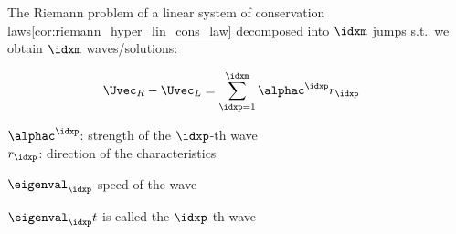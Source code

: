 \begin{corbox}\nospacing
    \begin{cor}\label{cor:jump_decomposition}
        The Riemann problem of a linear system of conservation laws\cref{cor:riemann_hyper_lin_cons_law}
        decomposed into $\idxm$ jumps s.t.\ we obtain $\idxm$ waves/solutions:\\
        \begin{minipage}{0.45\textwidth}
          \begin{align}
            \Uvec_{R}-\Uvec_{L}&=\sum_{\idxp=1}^{\idxm}\alphac^{\idxp}r_{\idxp}\label{eq:decoupled_riemann_problem_for_linear_systems}
          \end{align}
        \end{minipage}\hfill
        \begin{minipage}[c]{0.5\textwidth}
           \begin{figure}[H]
               \centering{
                 \def\svgwidth{150pt}
                 \resizebox{\linewidth}{!}{}
               }
           \end{figure}
        \end{minipage}
          $\alphac^{\idxp}$: strength of the $\idxp$-th wave\\
          $r_{\idxp}$: direction of the characteristics
    \end{cor}
\end{corbox}
\begin{explanationbox}\nospacing
    \begin{explanation}\leavevmode
        \begin{itemizenosep}
            \item $\eigenval_{\idxp}$ speed of the wave
            \item $\eigenval_{\idxp}t$ is called the $\idxp$-th wave
        \end{itemizenosep}
    \end{explanation}
\end{explanationbox}
